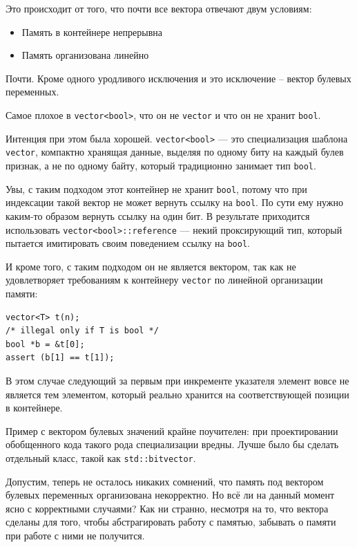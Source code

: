 \documentclass[a4paper,12pt,oneside]{book}
\begin{document}
Это происходит от того, что почти все вектора отвечают двум условиям:

\begin{itemize}
\item Память в контейнере непрерывна
\item Память организована линейно
\end{itemize}

Почти. Кроме одного уродливого исключения и это исключение -- вектор булевых переменных.

Самое плохое в \lstinline!vector<bool>!, что он не \lstinline!vector! и что он не хранит \lstinline!bool!.

Интенция при этом была хорошей. \lstinline!vector<bool>! — это специализация шаблона \lstinline!vector!, компактно хранящая данные, выделяя по одному биту на каждый булев признак, а не по одному байту, который традиционно занимает тип \lstinline!bool!.

Увы, с таким подходом этот контейнер не хранит \lstinline!bool!, потому что при индексации такой вектор не может вернуть ссылку на \lstinline!bool!. По сути ему нужно каким-то образом вернуть ссылку на один бит. В результате приходится использовать \lstinline!vector<bool>::reference! — некий проксирующий тип, который пытается имитировать своим поведением ссылку на \lstinline!bool!.

И кроме того, с таким подходом он не является вектором, так как не удовлетворяет требованиям к контейнеру \lstinline!vector! по линейной организации памяти:

\begin{lstlisting}
vector<T> t(n);
/* illegal only if T is bool */
bool *b = &t[0];
assert (b[1] == t[1]);
\end{lstlisting}

В этом случае следующий за первым при инкременте указателя элемент вовсе не является тем элементом, который реально хранится на соответствующей позиции в контейнере.

Пример с вектором булевых значений крайне поучителен: при проектировании обобщенного кода такого рода специализации вредны. Лучше было бы сделать отдельный класс, такой как \lstinline!std::bitvector!.

Допустим, теперь не осталось никаких сомнений, что память под вектором булевых переменных организована некорректно. Но всё ли на данный момент ясно с корректными случаями? Как ни странно, несмотря на то, что вектора сделаны для того, чтобы абстрагировать работу с памятью, забывать о памяти при работе с ними не получится.
\end{document}
